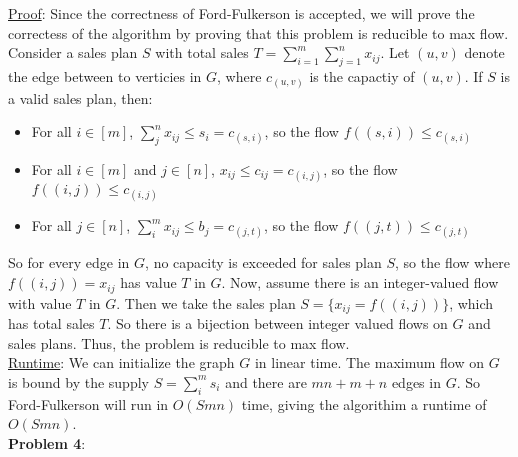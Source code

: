 \documentclass{article}
\begin{document}
\underline{Proof}: Since the correctness of Ford-Fulkerson is accepted, we will prove the correctess of the algorithm by proving that this problem is reducible to max flow. Consider a sales plan $S$ with total sales $T = \sum_{i = 1}^{m}\sum_{j = 1}^{n}x_{ij}$. Let $(u, v)$ denote the edge between to verticies in $G$, where $c_{(u, v)}$ is the capactiy of $(u, v)$. If $S$ is a valid sales plan, then: 
\begin{itemize}
    \item For all $i \in [m]$, $\sum_{j}^{n} x_{ij} \leq s_i = c_{(s, i)}$, so the flow $f((s, i)) \leq c_{(s, i)}$
    \item For all $i \in [m]$ and $j \in [n]$, $ x_{ij} \leq c_{ij} = c_{(i, j)}$, so the flow $f((i, j)) \leq c_{(i, j)}$
    \item For all $j \in [n]$, $\sum_{i}^{m} x_{ij} \leq b_j = c_{(j, t)}$, so the flow $f((j, t)) \leq c_{(j, t)}$
\end{itemize}
So for every edge in $G$, no capacity is exceeded for sales plan $S$, so the flow where $f((i, j)) = x_{ij}$ has value $T$ in $G$. Now, assume there is an integer-valued flow with value $T$ in $G$. Then we take the sales plan $S = \{x_{ij} = f((i, j))\}$, which has total sales $T$. So there is a bijection between integer valued flows on $G$ and sales plans. Thus, the problem is reducible to max flow.\\[0.5ex]
\underline{Runtime}: We can initialize the graph $G$ in linear time. The maximum flow on $G$ is bound by the supply $S = \sum_{i}^{m}s_i$ and there are $mn + m + n$ edges in $G$. So Ford-Fulkerson will run in $O(Smn)$ time, giving the algorithim a runtime of $O(Smn)$. \\[1.0ex]
\textbf{Problem 4}:
\end{document}
